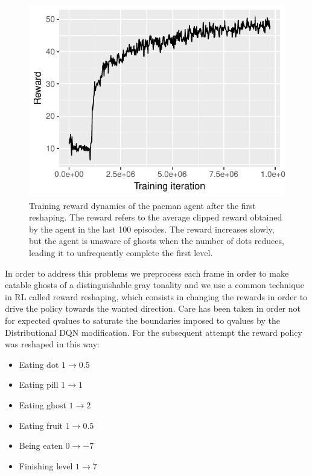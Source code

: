 \documentclass[10pt,twocolumn,letterpaper]{article}
\begin{document}
\begin{figure}
	\includegraphics[width=\linewidth]{run_results/plain_rainbow_reward.pdf}
	\caption{Training reward dynamics of the pacman agent after the first reshaping. The reward refers to the average clipped reward obtained by the agent in the last 100 episodes. The reward increases slowly, but the agent is unaware of ghosts when the number of dots reduces, leading it to unfrequently complete the first level.}
	\label{fig:rewardPacmanPlainRainbow}
\end{figure}

In order to address this problems we preprocess each frame in order to make eatable ghosts of a distinguishable gray tonality and we use a common technique in RL called reward reshaping, which consists in changing the rewards in order to drive the policy towards the wanted direction.
Care has been taken in order not for expected qvalues to saturate the boundaries imposed to qvalues by the Distributional DQN modification. For the subsequent attempt the reward policy was reshaped in this way:
\begin{itemize}
	\item Eating dot $1 \rightarrow 0.5$
	\item Eating pill $1 \rightarrow 1$
	\item Eating ghost $1 \rightarrow 2$
	\item Eating fruit $1 \rightarrow 0.5$
	\item Being eaten $0 \rightarrow -7$
	\item Finishing level $1 \rightarrow 7$
\end{itemize}
\end{document}
